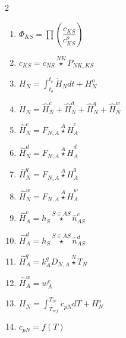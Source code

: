 \documentclass[10pt,a4paper]{report}
\begin{document}
\begin{multicols}{2}
\begin{enumerate}
		\item $\Phi_{KS} = \prod \left( \dfrac{c_{KS}}{c^{o}_{KS}} \right) $
		\item $c_{KS} = c_{NS} \overset{NK}{\star} P_{NK, KS}$		
		\item $H_N = \int_{t_o}^{t_e} \dot{H}_N dt + H^o_N$		
		\item $\dot{H}_N = \hat{H}^c_N + \hat{H}^d_N + \hat{H}^q_N + \hat{H}^w_N$
		\item $\hat{H}^c_N = F_{N,A} \overset{A}{\star} \hat{H}^c_A$
		\item $\hat{H}^d_N = F_{N,A} \overset{A}{\star} \hat{H}^d_A$
		\item $\hat{H}^q_N = F_{N,A} \overset{A}{\star} \hat{H}^q_A$
		\item $\hat{H}^w_N = F_{N,A} \overset{A}{\star} \hat{H}^w_A$ 
		\item $\hat{H}^c_A = h_S \overset{S \in AS}{\star} \hat{n}^c_{AS}$
		\item $\hat{H}^d_A = h_S \overset{S \in AS}{\star} \hat{n}^d_{AS}$
		\item $\hat{H}^q_A = k^q_A D_{N,A} \overset{N}{\star} T_N$
		\item $\hat{H}^w_A = w^e_A$
		\item $H_N = \int_{T_{ref}}^{T_N} c_{pN} dT + H^o_N$
		\item $c_{pN} = f(T)$
	\end{enumerate}
\end{multicols}	
\end{document}
